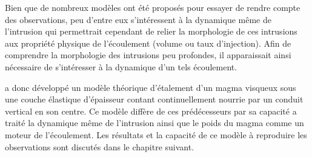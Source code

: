 Bien que de  nombreux modèles ont été proposés pour  essayer de rendre
compte des observations, peu d'entre  eux s'intéressent à la dynamique
même de l'intrusion qui permettrait cependant de relier la morphologie
de ces  intrusions aux propriété  physique de l'écoulement  (volume ou
taux d'injection).   Afin de comprendre la  morphologie des intrusions
peu profondes, il  apparaissait ainsi nécessaire de  s'intéresser à la
dynamique d'un tels écoulement.

\citet{Michaut:2011kg}   a   donc   développé  un   modèle   théorique
d'étalement d'un magma visqueux  sous une couche élastique d'épaisseur
contant continuellement nourrie par un conduit vertical en son centre.
Ce modèle  diffère de ces  prédécesseurs par  sa capacité a  traité la
dynamique même  de l'intrusion ainsi  que le  poids du magma  comme un
moteur de  l'écoulement. Les résultats et  la capacité de ce  modèle à
reproduire les observations sont discutés dans le chapitre suivant.

\newpage



